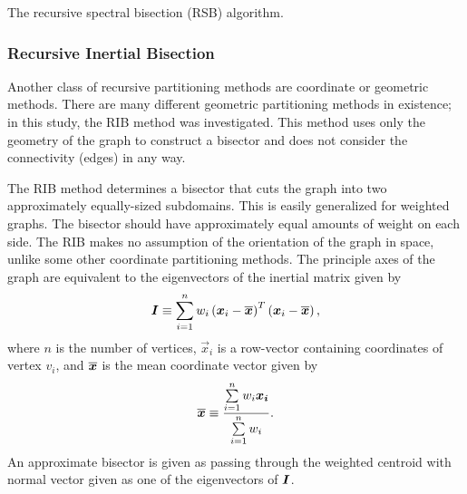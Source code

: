 {{{{        \begin{algorithm}
          \centering
          \caption{The recursive spectral bisection (RSB) algorithm.}
          \label{alg:Recursive Spectral Bisection}
          \begin{algorithmic}[1]
               
            \EndProcedure
          \end{algorithmic}
        \end{algorithm}
      }
      \subsubsection{Recursive Inertial Bisection}{\label{sssec:Spatial Decomposition:Recursive Inertial Bisection}
        Another class of recursive partitioning methods are coordinate or geometric methods.
        There are many different geometric partitioning methods in existence; in this study, the \ac{RIB} method \cite{Elsner1997,Floros1995} was investigated.
        This method uses only the geometry of the graph to construct a bisector and does not consider the connectivity (edges) in any way.

        The \ac{RIB} method determines a bisector that cuts the graph into two approximately equally-sized subdomains.
        This is easily generalized for weighted graphs.
        The bisector should have approximately equal amounts of weight on each side.
        The \ac{RIB} makes no assumption of the orientation of the graph in space, unlike some other coordinate partitioning methods.
        The principle axes of the graph are equivalent to the eigenvectors of the inertial matrix given by
        \begin{equation}
          \label{eq:Spatial Decomposition:Inertial Matrix}
          \mat{I} \defined \suml[i=1][n] w_i\left(\vec{x}_i-\avg{\vec{x}}\right)^T\left(\vec{x}_i-\avg{\vec{x}}\right),
        \end{equation}
        where $n$ is the number of vertices, $\vec{x}_i$ is a row-vector containing coordinates of vertex $v_i$, and $\overline{\boldsymbol{x}}$ is the mean coordinate vector given by
        \begin{equation}
          \label{eq:Spatial Decomposition:Mean Coordinates}
          \avg{\vec{x}} \defined \frac{\suml[i=1][n] w_i \vec{x_i}}{\suml[i=1][n] w_i}.
        \end{equation}
        An approximate bisector is given as passing through the weighted centroid with normal vector given as one of the eigenvectors of $\boldsymbol{I}$.

}}}}
